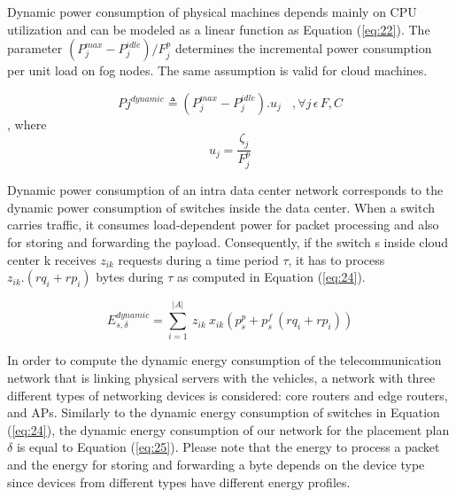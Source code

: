 \documentclass[twocolumn]{article}
\begin{document}
Dynamic power consumption of physical machines depends mainly on CPU utilization and can be modeled as a linear function\cite{wiesner2021leaf,lee2012energy,beloglazov2012energy,heinrich2017predicting,azizi2019priority} as Equation (\ref{eq:22}). The parameter $(P_{j}^{max}-P_{j}^{idle})/F_{j}^{p}$ determines the incremental power consumption per unit load on fog nodes. The same assumption is valid for cloud machines.

\begin{equation}
P {j}^{dynamic} \triangleq (P_{j}^{max}-P_{j}^{idle}).u_{j} \:\:\:\: ,\forall j\,\epsilon\,F,C 
\label{eq:22}
\end{equation}
, where
\begin{equation}
u_{j}=\frac{\zeta_{j}}{F_{j}^{p}} 
\label{eq:23}
\end{equation}

\par Dynamic power consumption of an intra data center network corresponds to the dynamic power consumption of switches inside the data center. When a switch carries traffic, it consumes load-dependent power for packet processing and also for storing and forwarding the payload\cite{vishwanath2014modeling,sivaraman2011profiling}. Consequently, if the switch s inside cloud center k receives $z_{ik}$ requests during a time period $\tau$, it has to process $z_{ik}.(rq_{i}+rp_{i})$ bytes during $\tau$ as computed in Equation (\ref{eq:24}).

\begin{equation}
E^{dynamic}_{s,\delta} =  \sum_{i=1}^{|A|} \ z_{ik} \ x_{ik} (p_{s}^{p} +  p_{s}^{f} \ (rq_{i}+rp_{i}))
\label{eq:24}
\end{equation}

\par In order to compute the dynamic energy consumption of the telecommunication network that is linking physical servers with the vehicles, a network with three different types of networking devices is considered: core routers and edge routers, and APs. Similarly to the dynamic energy consumption of switches in Equation (\ref{eq:24}), the dynamic energy consumption of our network for the placement plan $\delta$ is equal to Equation (\ref{eq:25}). Please note that the energy to process a packet and the energy for storing and forwarding a byte depends on the device type since devices from different types have different energy profiles.
\end{document}
